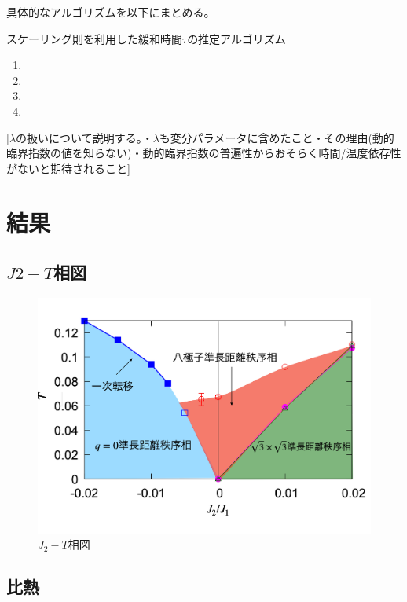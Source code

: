 \documentclass[12pt,titlepage,dvipdfmx]{jarticle}
\begin{document}
具体的なアルゴリズムを以下にまとめる。
\begin{itembox}[1]{スケーリング則を利用した緩和時間$\tau$の推定アルゴリズム}
   \begin{enumerate}
       \item 
       \item 
       \item 
       \item 
   \end{enumerate}
\end{itembox}

[$\lambda$の扱いについて説明する。・$\lambda$も変分パラメータに含めたこと・その理由(動的臨界指数の値を知らない)・動的臨界指数の普遍性からおそらく時間/温度依存性がないと期待されること]
\newpage

\section{結果}
\subsection{$J2-T$相図}

\begin{figure}[tbh]
   \centering
   \includegraphics[width=15cm]{figure/phase_diagram.pdf}
   \caption{$J_2-T$相図}
\end{figure}

\subsection{比熱}
\end{document}
